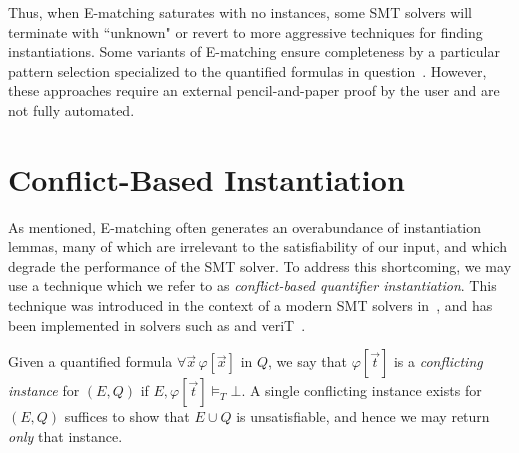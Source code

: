 \documentclass{easychair}
\begin{document}
Thus, when E-matching saturates with no instances, some SMT solvers will terminate with ``unknown"
or revert to more aggressive techniques for finding instantiations.
Some variants of E-matching ensure completeness by a particular pattern selection specialized to the quantified formulas in question~\cite{dross2016adding,bansaldeciding}.
However, these approaches require an external pencil-and-paper proof by the user and are not fully automated.

\section{Conflict-Based Instantiation}
\label{sec:cbqi}

As mentioned, E-matching often generates an overabundance of instantiation lemmas, 
many of which are irrelevant to the satisfiability of our input,
and which degrade the performance of the SMT solver.
To address this shortcoming, we may use a technique which we refer to as \emph{conflict-based quantifier instantiation}.
This technique was introduced in the context of a modern SMT solvers in~\cite{ReynoldsTinelliMoura14}, 
and has been implemented in solvers such as \cvc and veriT~\cite{DBLP:conf/cade/Barbosa16}.

Given a quantified formula $\forall \vec x\, \varphi[ \vec x ]$ in $Q$,
we say that $\varphi[ \vec t ]$ is a \emph{conflicting instance} for $( E, Q )$ if $E, \varphi[ \vec t ] \models_T \bot$.
A single conflicting instance exists for $(E, Q )$ suffices to show that $E \cup Q$ is unsatisfiable,
and hence we may return \emph{only} that instance.
\end{document}
